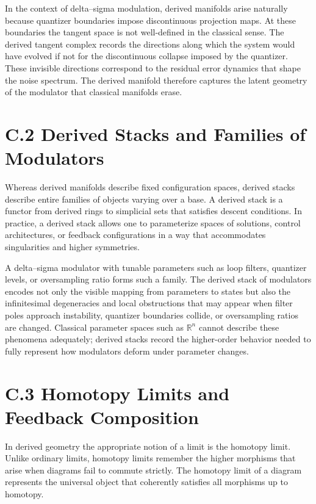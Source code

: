 In the context of delta–sigma modulation, derived manifolds arise naturally because quantizer boundaries impose discontinuous projection maps. At these boundaries the tangent space is not well-defined in the classical sense. The derived tangent complex records the directions along which the system would have evolved if not for the discontinuous collapse imposed by the quantizer. These invisible directions correspond to the residual error dynamics that shape the noise spectrum. The derived manifold therefore captures the latent geometry of the modulator that classical manifolds erase.

\section{C.2 Derived Stacks and Families of Modulators}

Whereas derived manifolds describe fixed configuration spaces, derived stacks describe entire families of objects varying over a base. A derived stack is a functor from derived rings to simplicial sets that satisfies descent conditions. In practice, a derived stack allows one to parameterize spaces of solutions, control architectures, or feedback configurations in a way that accommodates singularities and higher symmetries.

A delta–sigma modulator with tunable parameters such as loop filters, quantizer levels, or oversampling ratio forms such a family. The derived stack of modulators encodes not only the visible mapping from parameters to states but also the infinitesimal degeneracies and local obstructions that may appear when filter poles approach instability, quantizer boundaries collide, or oversampling ratios are changed. Classical parameter spaces such as \(\mathbb{R}^{n}\) cannot describe these phenomena adequately; derived stacks record the higher-order behavior needed to fully represent how modulators deform under parameter changes.

\section{C.3 Homotopy Limits and Feedback Composition}

In derived geometry the appropriate notion of a limit is the homotopy limit. Unlike ordinary limits, homotopy limits remember the higher morphisms that arise when diagrams fail to commute strictly. The homotopy limit of a diagram represents the universal object that coherently satisfies all morphisms up to homotopy.


